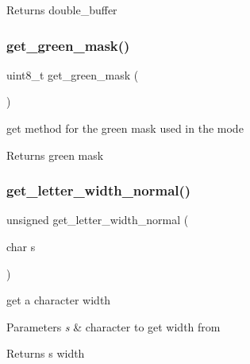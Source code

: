 \begin{DoxyReturn}{Returns}
double\+\_\+buffer 
\end{DoxyReturn}
\mbox{\label{group__Video_gab8c921f22eb318361b6fe018e1759267}} 
\subsubsection{\texorpdfstring{get\+\_\+green\+\_\+mask()}{get\_green\_mask()}}
{\footnotesize\ttfamily uint8\+\_\+t get\+\_\+green\+\_\+mask (\begin{DoxyParamCaption}{ }\end{DoxyParamCaption})}



get method for the green mask used in the mode 

\begin{DoxyReturn}{Returns}
green mask 
\end{DoxyReturn}
\mbox{\label{group__Video_ga5e63b50c933f1307aca72b0cafc77a14}} 
\subsubsection{\texorpdfstring{get\+\_\+letter\+\_\+width\+\_\+normal()}{get\_letter\_width\_normal()}}
{\footnotesize\ttfamily unsigned get\+\_\+letter\+\_\+width\+\_\+normal (\begin{DoxyParamCaption}\item[{char}]{s }\end{DoxyParamCaption})}



get a character width 


\begin{DoxyParams}{Parameters}
{\em s} & character to get width from\\
\hline
\end{DoxyParams}
\begin{DoxyReturn}{Returns}
s width 
\end{DoxyReturn}
\mbox{\label{group__Video_gaa3e656b61ae08209e349f5b3e7b1a76f}} 
